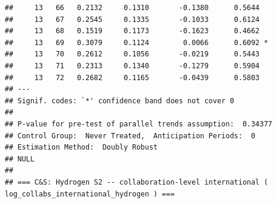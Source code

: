 \documentclass[
]{article}
\begin{document}
\begin{verbatim}
##     13   66   0.2132     0.1310       -0.1380      0.5644  
##     13   67   0.2545     0.1335       -0.1033      0.6124  
##     13   68   0.1519     0.1173       -0.1623      0.4662  
##     13   69   0.3079     0.1124        0.0066      0.6092 *
##     13   70   0.2612     0.1056       -0.0219      0.5443  
##     13   71   0.2313     0.1340       -0.1279      0.5904  
##     13   72   0.2682     0.1165       -0.0439      0.5803  
## ---
## Signif. codes: `*' confidence band does not cover 0
## 
## P-value for pre-test of parallel trends assumption:  0.34377
## Control Group:  Never Treated,  Anticipation Periods:  0
## Estimation Method:  Doubly Robust
## NULL
## 
## === C&S: Hydrogen S2 -- collaboration-level international ( log_collabs_international_hydrogen ) ===
\end{verbatim}
\end{document}
